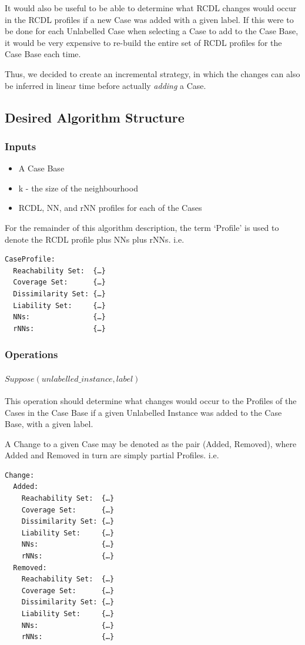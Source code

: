 \documentclass[a4paper,11pt]{report}
\begin{document}
It would also be useful to be able to determine what RCDL changes would occur in the RCDL profiles if a new Case was added with a given label. If this were to be done for each Unlabelled Case when selecting a Case to add to the Case Base, it would be very expensive to re-build the entire set of RCDL profiles for the Case Base each time.

Thus, we decided to create an incremental strategy, in which the changes can also be inferred in linear time before actually \emph{adding} a Case.

\subsection{Desired Algorithm Structure}
\subsubsection{Inputs}
\begin{itemize}
	\item A Case Base 
	\item k - the size of the neighbourhood
	\item RCDL, NN, and rNN profiles for each of the Cases
\end{itemize}

For the remainder of this algorithm description, the term `Profile' is used to denote the RCDL profile plus NNs plus rNNs. i.e. 
\begin{verbatim}
CaseProfile:  
  Reachability Set:  {…}
  Coverage Set:      {…}
  Dissimilarity Set: {…}
  Liability Set:     {…}
  NNs:               {…}
  rNNs:              {…}
\end{verbatim}

\subsubsection{Operations\label{sec:incralgstructops}}
\paragraph{$Suppose(unlabelled\_instance, label)$}
This operation should determine what changes would occur to the Profiles of the Cases in the Case Base if a given Unlabelled Instance was added to the Case Base, with a given label.

A Change to a given Case may be denoted as the pair (Added, Removed), where Added and Removed in turn are simply partial Profiles. i.e.
\begin{verbatim}
Change:
  Added:
    Reachability Set:  {…}
    Coverage Set:      {…}
    Dissimilarity Set: {…}
    Liability Set:     {…}
    NNs:               {…}
    rNNs:              {…}
  Removed:
    Reachability Set:  {…}
    Coverage Set:      {…}
    Dissimilarity Set: {…}
    Liability Set:     {…}
    NNs:               {…}
    rNNs:              {…}
\end{verbatim}
\end{document}
